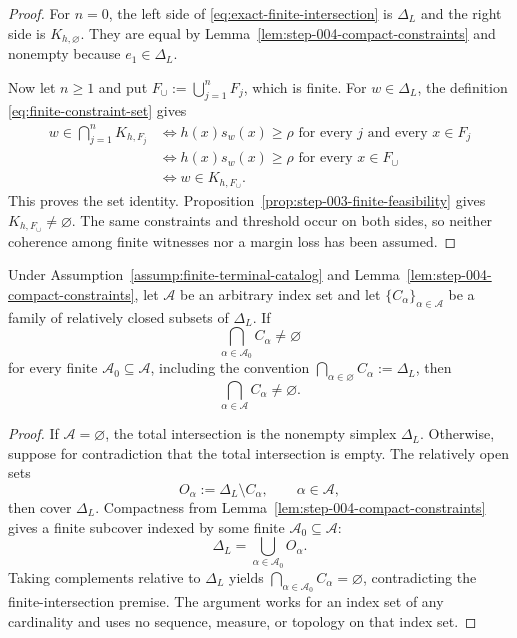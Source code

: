 \begin{proof}
For $n=0$, the left side of \eqref{eq:exact-finite-intersection} is
$\Delta_L$ and the right side is $K_{h,\varnothing}$.  They are equal by
Lemma~\ref{lem:step-004-compact-constraints} and nonempty because
$e_1\in\Delta_L$.

Now let $n\ge1$ and put $F_\cup:=\bigcup_{j=1}^nF_j$, which is finite.
For $w\in\Delta_L$, the definition \eqref{eq:finite-constraint-set} gives
\begin{align*}
w\in\bigcap_{j=1}^nK_{h,F_j}
&\iff
\text{$h(x)s_w(x)\ge\rho$ for every $j$ and every $x\in F_j$}\\
&\iff
\text{$h(x)s_w(x)\ge\rho$ for every $x\in F_\cup$}\\
&\iff w\in K_{h,F_\cup}.
\end{align*}
This proves the set identity.  Proposition~\ref{prop:step-003-finite-feasibility}
gives $K_{h,F_\cup}\ne\varnothing$.  The same constraints and threshold
occur on both sides, so neither coherence among finite witnesses nor a margin
loss has been assumed.
\end{proof}

\begin{lemma}
\label{lem:step-004-compact-fip}
Under Assumption~\ref{assump:finite-terminal-catalog} and
Lemma~\ref{lem:step-004-compact-constraints}, let $\mathcal A$ be an
arbitrary index set and let $\{C_\alpha\}_{\alpha\in\mathcal A}$ be a family
of relatively closed subsets of $\Delta_L$.  If
\[
\bigcap_{\alpha\in\mathcal A_0}C_\alpha\ne\varnothing
\]
for every finite $\mathcal A_0\subseteq\mathcal A$, including the convention
$\bigcap_{\alpha\in\varnothing}C_\alpha:=\Delta_L$, then
\[
\bigcap_{\alpha\in\mathcal A}C_\alpha\ne\varnothing.
\]
\end{lemma}

\begin{proof}
If $\mathcal A=\varnothing$, the total intersection is the nonempty simplex
$\Delta_L$.  Otherwise, suppose for contradiction that the total
intersection is empty.  The relatively open sets
\[
O_\alpha:=\Delta_L\setminus C_\alpha,
\qquad \alpha\in\mathcal A,
\]
then cover $\Delta_L$.  Compactness from
Lemma~\ref{lem:step-004-compact-constraints} gives a finite subcover indexed
by some finite $\mathcal A_0\subseteq\mathcal A$:
\[
\Delta_L=\bigcup_{\alpha\in\mathcal A_0}O_\alpha.
\]
Taking complements relative to $\Delta_L$ yields
$\bigcap_{\alpha\in\mathcal A_0}C_\alpha=\varnothing$, contradicting the
finite-intersection premise.  The argument works for an index set of any
cardinality and uses no sequence, measure, or topology on that index set.
\end{proof}

